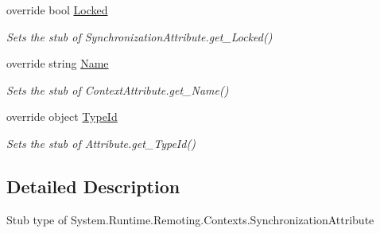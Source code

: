 \begin{DoxyCompactItemize}
override bool \hyperlink{class_system_1_1_runtime_1_1_remoting_1_1_contexts_1_1_fakes_1_1_stub_synchronization_attribute_a97e81e3519c0b8be9c3a05593964c913}{Locked}
\begin{DoxyCompactList}\small\item\em Sets the stub of Synchronization\-Attribute.\-get\-\_\-\-Locked()\end{DoxyCompactList}\item 
override string \hyperlink{class_system_1_1_runtime_1_1_remoting_1_1_contexts_1_1_fakes_1_1_stub_synchronization_attribute_a577ae593753cd7833f1e3797d2a4c3b5}{Name}
\begin{DoxyCompactList}\small\item\em Sets the stub of Context\-Attribute.\-get\-\_\-\-Name()\end{DoxyCompactList}\item 
override object \hyperlink{class_system_1_1_runtime_1_1_remoting_1_1_contexts_1_1_fakes_1_1_stub_synchronization_attribute_a992def3362f074f751735518318e0950}{Type\-Id}
\begin{DoxyCompactList}\small\item\em Sets the stub of Attribute.\-get\-\_\-\-Type\-Id()\end{DoxyCompactList}\end{DoxyCompactItemize}


\subsection{Detailed Description}
Stub type of System.\-Runtime.\-Remoting.\-Contexts.\-Synchronization\-Attribute



